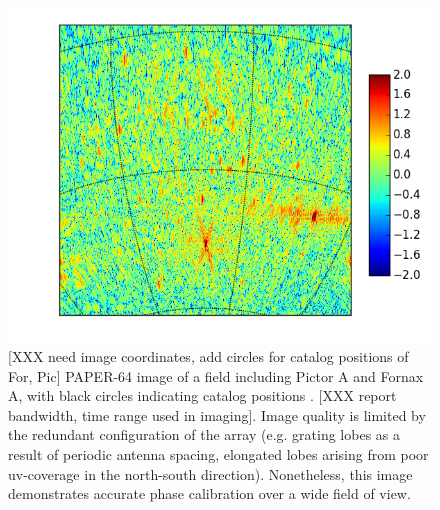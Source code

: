 \documentclass[twocolumn,numberedappendix]{emulateapj} \shorttitle{PSA64}
\begin{document}
\begin{figure}[!t]
\centering
\includegraphics[width=\columnwidth]{plots/picimg.png}
\caption{
[XXX need image coordinates, add circles for catalog positions of For, Pic]
PAPER-64 image of a field including Pictor A and Fornax A, with black circles
indicating catalog positions \citep{XXX}.
[XXX report bandwidth, time range used in imaging].
Image quality is limited by the redundant configuration of the array (e.g. grating lobes
as a result of periodic antenna spacing, elongated lobes
arising from poor uv-coverage in the north-south direction).  Nonetheless, this image
demonstrates accurate phase calibration over a wide field of view.
} \label{fig:field_image}
\end{figure}
\end{document}
